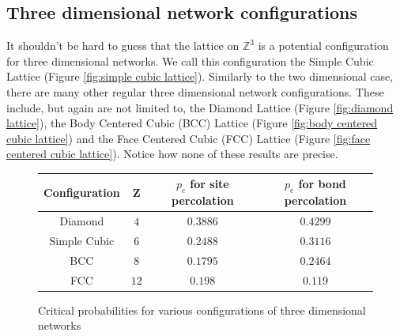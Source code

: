 \subsection*{Three dimensional network configurations}
It shouldn't be hard to guess that the lattice on $\mathbb{Z}^3$ is a potential configuration for three dimensional networks. We call this configuration the Simple Cubic Lattice (Figure
\ref{fig:simple cubic lattice}). Similarly to
the two dimensional case, there are many other regular three dimensional network configurations. These include, but again are not limited to, the Diamond Lattice (Figure
\ref{fig:diamond lattice}), the Body Centered Cubic (BCC) Lattice (Figure \ref{fig:body centered cubic lattice}) and the Face Centered Cubic (FCC) Lattice (Figure \ref{fig:face
centered cubic lattice}). Notice how none of these results are precise.

\begin{figure}[h!]
\begin{center}
\begin{tabular}{| c | c | c | c |}
    \hline
    Configuration & Z & $p_c$ for site percolation & $p_c$ for bond percolation \\
    \hline
    Diamond & $4$ & $0.3886$ & $0.4299$ \\
    Simple Cubic & $6$ & $0.2488$ & $0.3116$ \\
    BCC & $8$ & $0.1795$ & $0.2464$ \\
    FCC & $12$ & $0.198$ & $0.119$ \\
    \hline
  \end{tabular}
\end{center}
\centering
\caption{Critical probabilities for various configurations of three dimensional networks\cite[p. 11]{Sahimi}}
\label{fig:critical probabilities in three dimensions}
\end{figure}


